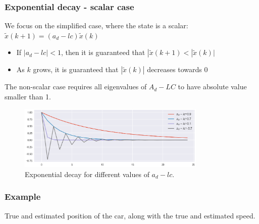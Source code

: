 \begin{frame}
	\frametitle{Exponential decay - scalar case}
	We focus on the simplified case, where the state is a scalar: $\tilde{x}(k+1)= (a_d-lc)\tilde{x}(k)$
	
	\begin{itemize}
		\item If $|a_d-lc|<1$, then it is guaranteed that $|\tilde{x}(k+1)< |\tilde{x}(k)|$
		\item As $k$ grows, it is guaranteed that $|\tilde{x}(k)|$ decreases towards 0
	\end{itemize}

	The non-scalar case requires all eigenvalues of $A_d-LC$ to have absolute value smaller than 1.
	
	\begin{figure}[b]
		\includegraphics[width=0.8\textwidth]{fig/exponential_decay}
		\caption*{Exponential decay for different values of $a_d-lc$.}
	\end{figure}
	
	
	
\end{frame}

\begin{frame}
    \frametitle{Example}
    True and estimated position of the car, along with the true and estimated speed.
\end{frame}

